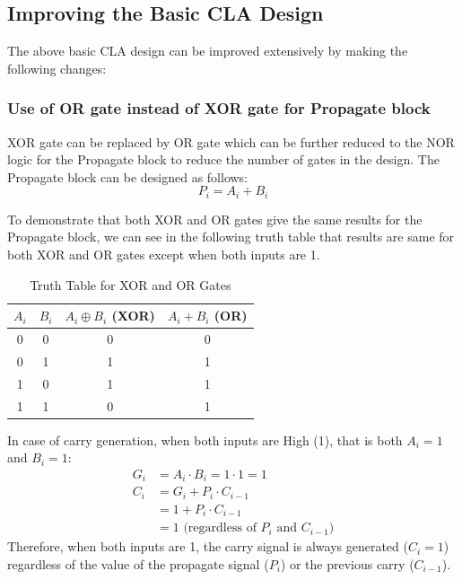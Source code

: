 \documentclass[conference]{IEEEtran}
\begin{document}
\subsection{Improving the Basic CLA Design}
The above basic CLA design can be improved extensively by making the following changes: 

\subsubsection{Use of OR gate instead of XOR gate for Propagate block}
XOR gate can be replaced by OR gate which can be further reduced to the NOR logic for the Propagate block to reduce the number of gates in the design. The Propagate block can be designed as follows:
\begin{equation}
    P_i = A_i + B_i
\end{equation}

To demonstrate that both XOR and OR gates give the same results for the Propagate block, we can see in the following truth table that results are same for both XOR and OR gates except when both inputs are 1.

\begin{table}[H]
\centering
\caption{Truth Table for XOR and OR Gates}
\begin{tabular}{|c|c|c|c|}
\hline
$A_i$ & $B_i$ & $A_i \oplus B_i$ (XOR) & $A_i + B_i$ (OR) \\ \hline
0     & 0     & 0                      & 0                \\ \hline
0     & 1     & 1                      & 1                \\ \hline
1     & 0     & 1                      & 1                \\ \hline
\rowcolor{cyan!10}
1     & 1     & 0                      & 1                \\ \hline
\end{tabular}
\label{tab:truth_table}
\end{table}

In case of carry generation, when both inputs are High (1), that is both $A_i = 1$ and $B_i = 1$:
\begin{align*}
G_i &= A_i \cdot B_i = 1 \cdot 1 = 1 \\
C_i &= G_i + P_i \cdot C_{i-1} \\
    &= 1 + P_i \cdot C_{i-1} \\
    &= 1 \text{ (regardless of } P_i \text{ and } C_{i-1}\text{)}
\end{align*}
Therefore, when both inputs are 1, the carry signal is always generated ($C_i = 1$) regardless of the value of the propagate signal ($P_i$) or the previous carry ($C_{i-1}$).
\end{document}
